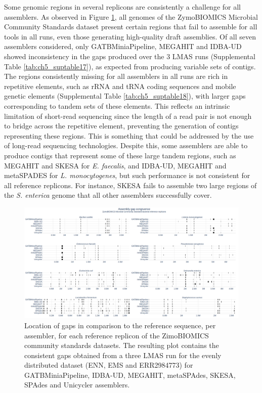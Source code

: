 Some genomic regions in several replicons are consistently a challenge for all assemblers. As observed in Figure \ref{fig:chap5_figure8}, all genomes of the ZymoBIOMICS Microbial Community Standards dataset present certain regions that fail to assemble for all tools in all runs, even those generating high-quality draft assemblies. Of all seven assemblers considered, only GATBMiniaPipeline, MEGAHIT and IDBA-UD showed inconsistency in the gaps produced over the 3 LMAS runs (Supplemental Table \ref{tab:ch5_suptable17}), as expected from producing variable sets of contigs. The regions consistently missing for all assemblers in all runs are rich in repetitive elements, such as rRNA and tRNA coding sequences and mobile genetic elements (Supplemental Table \ref{tab:ch5_suptable18}), with larger gaps corresponding to tandem sets of these elements. This reflects an intrinsic limitation of short-read sequencing since the length of a read pair is not enough to bridge across the repetitive element, preventing the generation of contigs representing these regions. This is something that could be addressed by the use of long-read sequencing technologies. Despite this, some assemblers are able to produce contigs that represent some of these large tandem regions, such as MEGAHIT and SKESA for \textit{E. faecalis}, and IDBA-UD, MEGAHIT and metaSPADES for \textit{L. monocytogenes}, but such performance is not consistent for all reference replicons. For instance, SKESA fails to assemble two large regions of the \textit{S. enterica} genome that all other assemblers successfully cover.

\begin{figure}[h!]
\centering
\includegraphics[width=\textwidth]{figures/chapter 5/Figure 8.png}
\caption{Location of gaps in comparison to the reference sequence, per assembler, for each reference replicon of the ZimoBIOMICS community standards datasets. The resulting plot contains the consistent gaps obtained from a three LMAS run for the evenly distributed dataset (ENN, EMS and ERR2984773) for GATBMiniaPipeline, IDBA-UD, MEGAHIT, metaSPAdes, SKESA, SPAdes and Unicycler assemblers.}
\label{fig:chap5_figure8}
\end{figure}

